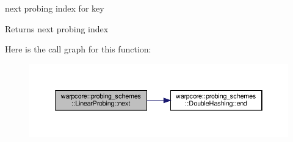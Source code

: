 next probing index for {\ttfamily key} 

\begin{DoxyReturn}{Returns}
next probing index 
\end{DoxyReturn}
Here is the call graph for this function\+:
\nopagebreak
\begin{figure}[H]
\begin{center}
\leavevmode
\includegraphics[width=350pt]{classwarpcore_1_1probing__schemes_1_1LinearProbing_ad984d7ad47f44ada91df47f135473176_cgraph}
\end{center}
\end{figure}
